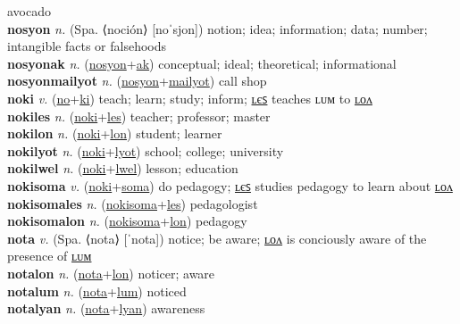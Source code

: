 avocado \label{nonfut} \\
\textbf{nosyon} \textit{n.} (Spa. ⟨noción⟩ [noˈsjon])
notion; idea; information; data; number; intangible facts or falsehoods \label{nosyon} \\
\textbf{nosyonak} \textit{n.} (\hyperref[nosyon]{nosyon}+\hyperref[ak]{ak})
conceptual; ideal; theoretical; informational \label{nosyonak} \\
\textbf{nosyonmailyot} \textit{n.} (\hyperref[nosyon]{nosyon}+\hyperref[mailyot]{mailyot})
call shop \label{nosyonmailyot} \\
\textbf{noki} \textit{v.} (\hyperref[no]{no}+\hyperref[ki]{ki})
teach; learn; study; inform; \hyperref[nokiles]{ʟєꜱ} teaches ʟᴜᴍ to \hyperref[nokilon]{ʟᴏᴧ} \label{noki} \\
\textbf{nokiles} \textit{n.} (\hyperref[noki]{noki}+\hyperref[les]{les})
teacher; professor; master \label{nokiles} \\
\textbf{nokilon} \textit{n.} (\hyperref[noki]{noki}+\hyperref[lon]{lon})
student; learner \label{nokilon} \\
\textbf{nokilyot} \textit{n.} (\hyperref[noki]{noki}+\hyperref[lyot]{lyot})
school; college; university \label{nokilyot} \\
\textbf{nokilwel} \textit{n.} (\hyperref[noki]{noki}+\hyperref[lwel]{lwel})
lesson; education \label{nokilwel} \\
\textbf{nokisoma} \textit{v.} (\hyperref[noki]{noki}+\hyperref[soma]{soma})
do pedagogy; \hyperref[nokisomales]{ʟєꜱ} studies pedagogy to learn about \hyperref[nokisomalon]{ʟᴏᴧ} \label{nokisoma} \\
\textbf{nokisomales} \textit{n.} (\hyperref[nokisoma]{nokisoma}+\hyperref[les]{les})
pedagologist \label{nokisomales} \\
\textbf{nokisomalon} \textit{n.} (\hyperref[nokisoma]{nokisoma}+\hyperref[lon]{lon})
pedagogy \label{nokisomalon} \\
\textbf{nota} \textit{v.} (Spa. ⟨nota⟩ [ˈnota])
notice; be aware; \hyperref[notalon]{ʟᴏᴧ} is conciously aware of the presence of \hyperref[notalum]{ʟᴜᴍ} \label{nota} \\
\textbf{notalon} \textit{n.} (\hyperref[nota]{nota}+\hyperref[lon]{lon})
noticer; aware \label{notalon} \\
\textbf{notalum} \textit{n.} (\hyperref[nota]{nota}+\hyperref[lum]{lum})
noticed \label{notalum} \\
\textbf{notalyan} \textit{n.} (\hyperref[nota]{nota}+\hyperref[lyan]{lyan})
awareness \label{notalyan} \\
